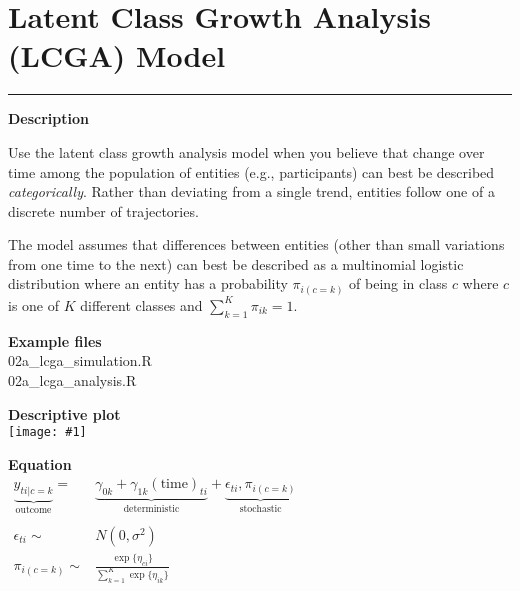 \documentclass[10pt, landscape, article]{memoir}
\newcommand{\outcome}[1]{\underbrace{#1}_{\text{outcome}}}
\newcommand{\deterministic}[1]{\underbrace{#1}_{\text{deterministic}}}
\newcommand{\stochastic}[1]{\underbrace{#1}_{\text{stochastic}}}
\newenvironment{desc}{
    \begin{minipage}[t][.6\textheight][t]{.9\textwidth}
    \setlength{\parskip}{.5\baselineskip}
    \textbf{\large Description}\\\raggedright
}{
    \end{minipage}
}
\newenvironment{eqn}{
    \begin{minipage}[t][.39\textheight][t]{\textwidth}
    \textbf{\large Equation}\\
}{
    \end{minipage}
}
\newcommand{\datafig}[1]{
    \begin{minipage}[t][.6\textheight][t]{\textwidth}%
    \textbf{\large Descriptive plot}\\
    \texttt{[image: \#1]}%
    \end{minipage}
}
\newenvironment{files}{
    \begin{minipage}[t][.2\textheight][t]{\textwidth}
    \textbf{\large Example files}\\
}{
    \end{minipage}
}
\begin{document}
\chapter{Latent Class Growth Analysis (LCGA) Model}
\label{lcga}
\rule[\baselineskip]{\textwidth}{3pt}
\begin{minipage}[t][.9\textheight][t]{.4\textwidth}
\begin{desc}
Use the latent class growth analysis model when you believe that change over time among the population of entities (e.g., participants) can best be described \emph{categorically}. Rather than deviating from a single trend, entities follow one of a discrete number of trajectories.

The model assumes that differences between entities (other than small variations from one time to the next) can best be described as a multinomial logistic distribution where an entity has a probability $\pi_{i(c{=}k)}$ of being in class $c$ where $c$ is one of $K$ different classes and $\sum^K_{k{=}1}\pi_{ik}=1$.
\end{desc}
\begin{files}
02a\_lcga\_simulation.R\\02a\_lcga\_analysis.R
\end{files}
\end{minipage} %
\begin{minipage}[t][.9\textheight][t]{.6\textwidth}
\datafig{lcga.pdf}
\begin{eqn}
$\begin{array}{rl}
\outcome{y_{ti|c=k}} = & 
\deterministic{\gamma_{0k} + \gamma_{1k}(\text{time})_{ti}} + 
\stochastic{\epsilon_{ti}, \pi_{i(c=k)}} \\
&\\
\epsilon_{ti} \sim & N(0, \sigma^2) \\
\pi_{i(c=k)} \sim & \frac{\exp\{\eta_{ci}\}}{\sum^K_{k=1}\exp\{\eta_{ik}\}}
\end{array}$
\end{eqn}
\end{minipage}
\newpage
\end{document}
